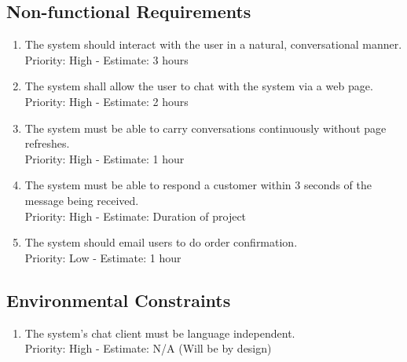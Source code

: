 \documentclass[11pt, titlepage]{article}
\begin{document}
\subsection{Non-functional Requirements}
\begin{enumerate}
\item The system should interact with the user in a natural, conversational
manner.
\\ Priority: High - Estimate: 3 hours
\item The system shall allow the user to chat with the system via a web page.
\\ Priority: High - Estimate: 2 hours
\item The system must be able to carry conversations continuously without page
refreshes.
\\ Priority: High - Estimate: 1 hour
\item The system must be able to respond a customer within 3 seconds of the
message being received.
\\ Priority: High - Estimate: Duration of project
\item The system should email users to do order confirmation.
\\ Priority: Low - Estimate: 1 hour
\end{enumerate}
\subsection{Environmental Constraints}
\begin{enumerate}
\item The system's chat client must be language independent.
\\ Priority: High - Estimate: N/A (Will be by design)
\end{enumerate}
\end{document}
